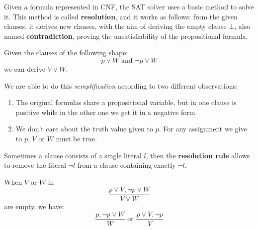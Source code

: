 Given a formula represented in CNF, the SAT solver uses a basic method to solve it. This method is called \textbf{resolution}, and it works as follows:
from the given clauses, it derives new clauses, with the aim of deriving the empty clause $\bot$, also named \textbf{contradiction}, proving the unsatisfiability 
of the propositional formula.
\begin{example}[title = Resolution rule]
    Given the clauses of the following shape:
    $$ p \vee W \text{ and } \neg p \vee W $$
    we can derive $V \vee W$. \vspace{7pt}

    We are able to do this \textit{semplification} according to two different observations:
    \begin{enumerate}
        \item The original formulas share a propositional variable, but in one clause is positive while in the other one we get it in a negative form.
        \item We don't care about the truth value given to $p$. For any assignment we give to $p$, $V$ or $W$ must be true.
    \end{enumerate}
\end{example}
Sometimes a clause consists of a single literal $l$, then the \textbf{resolution rule} allows to remove the literal $\neg l$ from a clause containing exactly 
$\neg l$.
\begin{example}[title = Unit resolution]
    When $V$ or $W$ in 
    $$ \frac{p \vee V, \neg p \vee W}{V \vee W} $$
    are empty, we have:
    $$ \frac{p, \neg p \vee W}{W} \text{ or } \frac{p \vee V, \neg p}{V} $$
\end{example}

